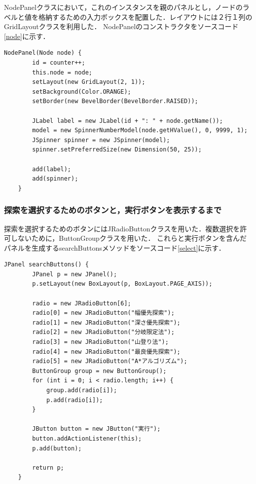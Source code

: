 \documentclass[12pt]{jarticle}
\begin{document}
NodePanelクラスにおいて，これのインスタンスを親のパネルとし，ノードのラベルと値を格納するための入力ボックスを配置した．レイアウトには２行１列のGridLayoutクラスを利用した．
NodePanelのコンストラクタをソースコード\ref{node}に示す．

\begin{lstlisting}[caption=NodePanelのコンストラクタ, label=node]
    NodePanel(Node node) {
        id = counter++;
        this.node = node;
        setLayout(new GridLayout(2, 1));
        setBackground(Color.ORANGE);
        setBorder(new BevelBorder(BevelBorder.RAISED));

        JLabel label = new JLabel(id + ": " + node.getName());
        model = new SpinnerNumberModel(node.getHValue(), 0, 9999, 1);
        JSpinner spinner = new JSpinner(model);
        spinner.setPreferredSize(new Dimension(50, 25));

        add(label);
        add(spinner);
    }
\end{lstlisting}

\subsubsection{探索を選択するためのボタンと，実行ボタンを表示するまで}
探索を選択するためのボタンにはJRadioButtonクラスを用いた．複数選択を許可しないために，ButtonGroupクラスを用いた．
これらと実行ボタンを含んだパネルを生成するsearchButtonsメソッドをソースコード\ref{select}に示す．

\begin{lstlisting}[caption=searchButtonsメソッド, label=select]
    JPanel searchButtons() {
        JPanel p = new JPanel();
        p.setLayout(new BoxLayout(p, BoxLayout.PAGE_AXIS));
    
        radio = new JRadioButton[6];
        radio[0] = new JRadioButton("幅優先探索");
        radio[1] = new JRadioButton("深さ優先探索");
        radio[2] = new JRadioButton("分岐限定法");
        radio[3] = new JRadioButton("山登り法");
        radio[4] = new JRadioButton("最良優先探索");
        radio[5] = new JRadioButton("A*アルゴリズム");
        ButtonGroup group = new ButtonGroup();
        for (int i = 0; i < radio.length; i++) {
            group.add(radio[i]);
            p.add(radio[i]);
        }
        
        JButton button = new JButton("実行");
        button.addActionListener(this);
        p.add(button);

        return p;
    }
\end{lstlisting}
\end{document}
